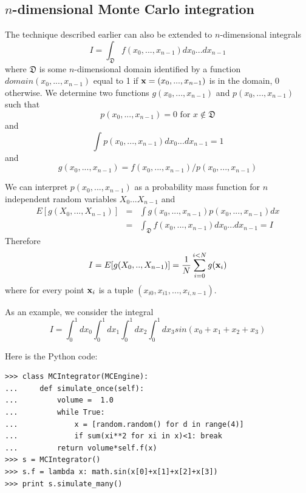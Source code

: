 \documentclass[justified,sixbynine]{tufte-book}
\theoremstyle{plain}%
\theoremstyle{definition}
\theoremstyle{remark}
\begin{document}
\begin{fullwidth}
\goodbreak\subsection{$n$-dimensional Monte Carlo integration}

The technique described earlier can also be extended to $n$-dimensional integrals
\begin{equation}
I=\int_{{\mathfrak D}}f(x_0,...,x_{n-1})dx_0...dx_{n-1}
\end{equation}
where ${\mathfrak D}$ is some $n$-dimensional domain identified by a function $%
domain(x_0,...,x_{n-1})$ equal to 1 if ${\bf x}=(x_0,...,x_{n-1})$ is in the
domain, 0 otherwise. We determine two functions $g(x_0,...,x_{n-1})$ and $%
p(x_0,...,x_{n-1})$ such that
\begin{equation}
p(x_0,...,x_{n-1})=0\text{ for }x\notin {\mathfrak D}
\end{equation}
and
\begin{equation}
\int p(x_0,...,x_{n-1})dx_0...dx_{n-1}=1
\end{equation}
and
\begin{equation}
g(x_0,...,x_{n-1})=f(x_0,...,x_{n-1})/p(x_0,...,x_{n-1})
\end{equation}

We can interpret $p(x_0,...,x_{n-1})$ as a probability mass function for $n$
independent random variables $X_0$...$X_{n-1}$ and
\begin{eqnarray}
E[g(X_0,...,X_{n-1})] &=&\int g(x_0,...,x_{n-1})p(x_0,...,x_{n-1})dx \\
&=&\int_{{\mathfrak D}}f(x_0,...,x_{n-1})dx_0...dx_{n-1}=I
\end{eqnarray}
Therefore
\begin{equation}
I=E[g(X_0,..,X_{n-1})] = \frac 1N\sum_{i=0}^{i<N}g({\bf x}_i)
\end{equation}
where for every point ${\bf x}_i$ is a tuple $(x_{i0},x_{i1},...,x_{i,n-1})$.

As an example, we consider the integral
\begin{equation}
I = \int_0^1 dx_0 \int_0^1 dx_1 \int_0^1 dx_2 \int_0^1 dx_3 sin(x_0+x_1+x_2+x_3)
\end{equation}

Here is the Python code:
\begin{lstlisting}
>>> class MCIntegrator(MCEngine):
...     def simulate_once(self):
...         volume =  1.0
...         while True:
...             x = [random.random() for d in range(4)]
...             if sum(xi**2 for xi in x)<1: break
...         return volume*self.f(x)
>>> s = MCIntegrator()
>>> s.f = lambda x: math.sin(x[0]+x[1]+x[2]+x[3])
>>> print s.simulate_many()
\end{lstlisting}


\end{fullwidth}
\end{document}
